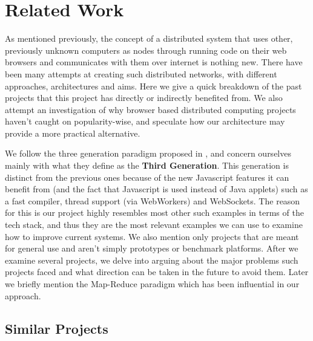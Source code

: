 \chapter{Related Work}
As mentioned previously, the concept of a distributed system that uses other, previously unknown computers as nodes through running code on their web browsers and communicates with them over internet is nothing new. There have been many attempts at creating such distributed networks, with different approaches, architectures and aims. Here we give a quick breakdown of the past projects that this project has directly or indirectly benefited from. We also attempt an investigation of why browser based distributed computing projects haven't caught on popularity-wise, and speculate how our architecture may provide a more practical alternative.

We follow the three generation paradigm proposed in \cite{fabisiak2017browser}, and concern ourselves mainly with what they define as the \textbf{Third Generation}. This generation is distinct from the previous ones because of the new Javascript features it can benefit from (and the fact that Javascript is used instead of Java applets) such as a fast compiler, thread support (via WebWorkers) and WebSockets. The reason for this is our project highly resembles most other such examples in terms of the tech stack, and thus they are the most relevant examples we can use to examine how to improve current systems. 
We also mention only projects that are meant for general use and aren't simply prototypes or benchmark platforms.
After we examine several projects, we delve into arguing about the major problems such projects faced and what direction can be taken in the future to avoid them. Later we briefly mention the Map-Reduce paradigm which has been influential in our approach.

\section{Similar Projects}
